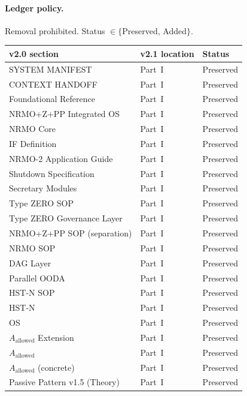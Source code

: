 \paragraph{Ledger policy.}
Removal prohibited. Status $\in \{$Preserved, Added$\}$.

\begin{table}[ht]
\centering
\scriptsize
\begin{tabularx}{\linewidth}{lXl}
\toprule
\textbf{v2.0 section} & \textbf{v2.1 location} & \textbf{Status} \\
\midrule
SYSTEM MANIFEST                & Part~I & Preserved \\
CONTEXT HANDOFF                & Part~I & Preserved \\
Foundational Reference         & Part~I & Preserved \\
NRMO+Z+PP Integrated OS        & Part~I & Preserved \\
NRMO Core                      & Part~I & Preserved \\
IF Definition                  & Part~I & Preserved \\
NRMO-2 Application Guide       & Part~I & Preserved \\
Shutdown Specification         & Part~I & Preserved \\
Secretary Modules              & Part~I & Preserved \\
Type ZERO SOP                  & Part~I & Preserved \\
Type ZERO Governance Layer     & Part~I & Preserved \\
NRMO+Z+PP SOP (separation)     & Part~I & Preserved \\
NRMO SOP                       & Part~I & Preserved \\
DAG Layer                      & Part~I & Preserved \\
Parallel OODA                  & Part~I & Preserved \\
HST-N SOP                      & Part~I & Preserved \\
HST-N                          & Part~I & Preserved \\
OS                             & Part~I & Preserved \\
$A_{\mathrm{allowed}}$ Extension & Part~I & Preserved \\
$A_{\mathrm{allowed}}$         & Part~I & Preserved \\
$A_{\mathrm{allowed}}$ (concrete) & Part~I & Preserved \\
Passive Pattern v1.5 (Theory)  & Part~I & Preserved \\

\end{tabularx}
\end{table}
